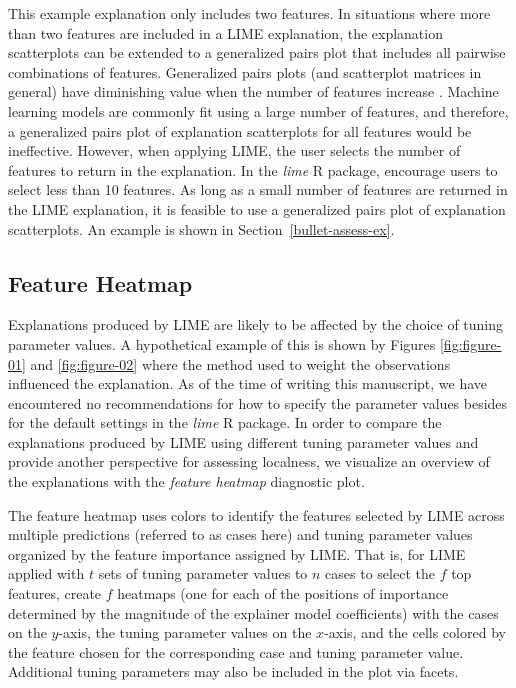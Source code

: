 \documentclass[AMS,STIX2COL]{WileyNJD-v2}\usepackage[]{graphicx}\usepackage[]{color}
\begin{document}
This example explanation only includes two features. In situations where more than two features are included in a LIME explanation, the explanation scatterplots can be extended to a generalized pairs plot \citep{emerson:2013} that includes all pairwise combinations of features. Generalized pairs plots (and scatterplot matrices in general) have diminishing value when the number of features increase \citep{jensen:2011} \citep{sweller:2011}. Machine learning models are commonly fit using a large number of features, and therefore, a generalized pairs plot of explanation scatterplots for all features would be ineffective. However, when applying LIME, the user selects the number of features to return in the explanation. In the \emph{lime} R package, \citet{pedersen:2020} encourage users to select less than 10 features. As long as a small number of features are returned in the LIME explanation,  it is feasible to use a generalized pairs plot of explanation scatterplots. An example is shown in Section~\ref{bullet-assess-ex}.

\subsection{Feature Heatmap} \label{feat-heat}

Explanations produced by LIME are likely to be affected by the choice of tuning parameter values. A hypothetical example of this is shown by Figures \ref{fig:figure-01} and \ref{fig:figure-02} where the method used to weight the observations influenced the explanation. As of the time of writing this manuscript, we have encountered no recommendations for how to specify the parameter values besides for the default settings in the \emph{lime} R package. In order to compare the explanations produced by LIME using different tuning parameter values and provide another perspective for assessing localness, we visualize an overview of the explanations with the \emph{feature heatmap} diagnostic plot. 

The feature heatmap uses colors to identify the features selected by LIME across multiple predictions (referred to as cases here) and tuning parameter values organized by the feature importance assigned by LIME. That is, for LIME applied with $t$ sets of tuning parameter values to $n$ cases to select the $f$ top features, create $f$ heatmaps (one for each of the positions of importance determined by the magnitude of the explainer model coefficients) with the cases on the $y$-axis, the tuning parameter values on the $x$-axis, and the cells colored by the feature chosen for the corresponding case and tuning parameter value. Additional tuning parameters may also be included in the plot via facets. 
\end{document}
